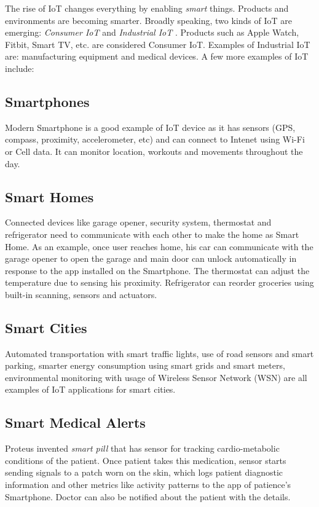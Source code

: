\documentclass[sigconf]{acmart}
\begin{document}
	The rise of IoT changes everything by enabling {\em smart} things. Products and environments are becoming smarter. Broadly speaking, two kinds of IoT are emerging: {\em Consumer IoT} and {\em Industrial IoT} \cite{iot}. Products such as Apple Watch, Fitbit, Smart TV, etc. are considered Consumer IoT. Examples of Industrial IoT are: manufacturing equipment and medical devices. A few more examples of IoT include:
	
	\subsection{Smartphones}
	Modern Smartphone is a good example of IoT device as it has sensors (GPS, compass, proximity, accelerometer, etc) and can connect to Intenet using Wi-Fi or Cell data. It can monitor location, workouts and movements throughout the day.
	
	\subsection{Smart Homes}
	
	Connected devices like garage opener, security system, thermostat and refrigerator need to communicate with each other to make the home as Smart Home. As an example, once user reaches home, his car can communicate with the garage opener to open the garage and main door can unlock automatically in response to the app installed on the Smartphone. The thermostat can adjust the temperature due to sensing his proximity. Refrigerator can reorder groceries using built-in scanning, sensors and actuators. 	
	
	\subsection{Smart Cities}
	
	Automated transportation with smart traffic lights, use of road sensors and smart parking, smarter energy consumption using smart grids and smart meters, environmental monitoring with usage of Wireless Sensor Network (WSN) are all examples of IoT applications for smart cities.
	
	\subsection{Smart Medical Alerts}
	
	Proteus invented {\em smart pill} that has sensor for tracking cardio-metabolic conditions of the patient. Once patient takes this medication, sensor starts sending signals to a patch worn on the skin, which logs patient diagnostic information and other metrics like activity patterns to the app of patience's Smartphone. Doctor can also be notified about the patient with the details\cite{proteus}.
	
\end{document}
